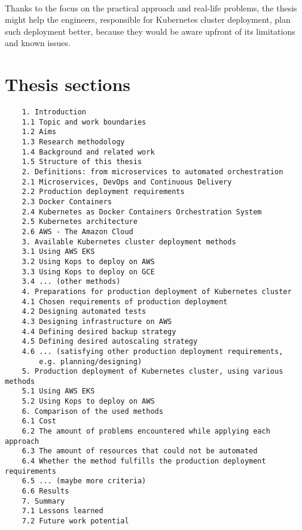\documentclass[12pt]{article}
\begin{document}
\paragraph{}
Thanks to the focus on the practical approach and real-life problems, the thesis might help the engineers, responsible for Kubernetes cluster deployment, plan such deployment better, because they would be aware upfront of its limitations and known issues.


\section{Thesis sections}

\begin{lstlisting}
    1. Introduction
    1.1 Topic and work boundaries
    1.2 Aims
    1.3 Research methodology
    1.4 Background and related work
    1.5 Structure of this thesis
    2. Definitions: from microservices to automated orchestration
    2.1 Microservices, DevOps and Continuous Delivery
    2.2 Production deployment requirements
    2.3 Docker Containers
    2.4 Kubernetes as Docker Containers Orchestration System
    2.5 Kubernetes architecture
    2.6 AWS - The Amazon Cloud
    3. Available Kubernetes cluster deployment methods
    3.1 Using AWS EKS
    3.2 Using Kops to deploy on AWS
    3.3 Using Kops to deploy on GCE
    3.4 ... (other methods)
    4. Preparations for production deployment of Kubernetes cluster
    4.1 Chosen requirements of production deployment
    4.2 Designing automated tests
    4.3 Designing infrastructure on AWS
    4.4 Defining desired backup strategy
    4.5 Defining desired autoscaling strategy
    4.6 ... (satisfying other production deployment requirements,
        e.g. planning/designing)
    5. Production deployment of Kubernetes cluster, using various methods
    5.1 Using AWS EKS
    5.2 Using Kops to deploy on AWS
    6. Comparison of the used methods
    6.1 Cost
    6.2 The amount of problems encountered while applying each approach
    6.3 The amount of resources that could not be automated
    6.4 Whether the method fulfills the production deployment requirements
    6.5 ... (maybe more criteria)
    6.6 Results
    7. Summary
    7.1 Lessons learned
    7.2 Future work potential    
\end{lstlisting}
\end{document}
